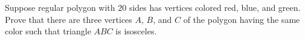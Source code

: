 Suppose regular polygon with $20$ sides has vertices colored red, blue, and green. Prove that there are three vertices $A$, $B$, and $C$ of the polygon having the same color such that triangle $ABC$ is isosceles.
